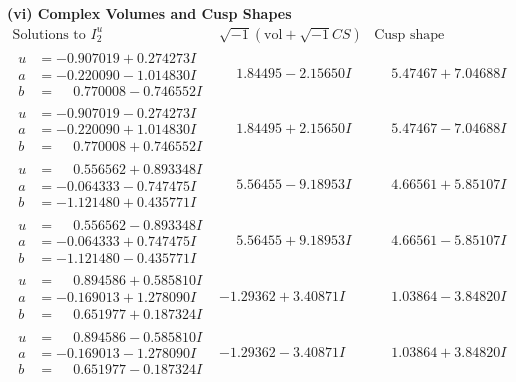 \documentclass[1p]{elsarticle_modified}
\theoremstyle{definition}
\newcommand{\I}{\sqrt{-1}}
\begin{document}
\newpage\flushleft \textbf{(vi) Complex Volumes and Cusp Shapes}
$$\begin{array}{c|c|c}  
\text{Solutions to }I^u_{2}& \I (\text{vol} + \sqrt{-1}CS) & \text{Cusp shape}\\
 \hline 
\begin{aligned}
u &= -0.907019 + 0.274273 I \\
a &= -0.220090 - 1.014830 I \\
b &= \phantom{-}0.770008 - 0.746552 I\end{aligned}
 & \phantom{-}1.84495 - 2.15650 I & \phantom{-}5.47467 + 7.04688 I \\ \hline\begin{aligned}
u &= -0.907019 - 0.274273 I \\
a &= -0.220090 + 1.014830 I \\
b &= \phantom{-}0.770008 + 0.746552 I\end{aligned}
 & \phantom{-}1.84495 + 2.15650 I & \phantom{-}5.47467 - 7.04688 I \\ \hline\begin{aligned}
u &= \phantom{-}0.556562 + 0.893348 I \\
a &= -0.064333 - 0.747475 I \\
b &= -1.121480 + 0.435771 I\end{aligned}
 & \phantom{-}5.56455 - 9.18953 I & \phantom{-}4.66561 + 5.85107 I \\ \hline\begin{aligned}
u &= \phantom{-}0.556562 - 0.893348 I \\
a &= -0.064333 + 0.747475 I \\
b &= -1.121480 - 0.435771 I\end{aligned}
 & \phantom{-}5.56455 + 9.18953 I & \phantom{-}4.66561 - 5.85107 I \\ \hline\begin{aligned}
u &= \phantom{-}0.894586 + 0.585810 I \\
a &= -0.169013 + 1.278090 I \\
b &= \phantom{-}0.651977 + 0.187324 I\end{aligned}
 & -1.29362 + 3.40871 I & \phantom{-}1.03864 - 3.84820 I \\ \hline\begin{aligned}
u &= \phantom{-}0.894586 - 0.585810 I \\
a &= -0.169013 - 1.278090 I \\
b &= \phantom{-}0.651977 - 0.187324 I\end{aligned}
 & -1.29362 - 3.40871 I & \phantom{-}1.03864 + 3.84820 I \\ \hline\begin{aligned}

\end{aligned}
\end{array}$$
\end{document}
